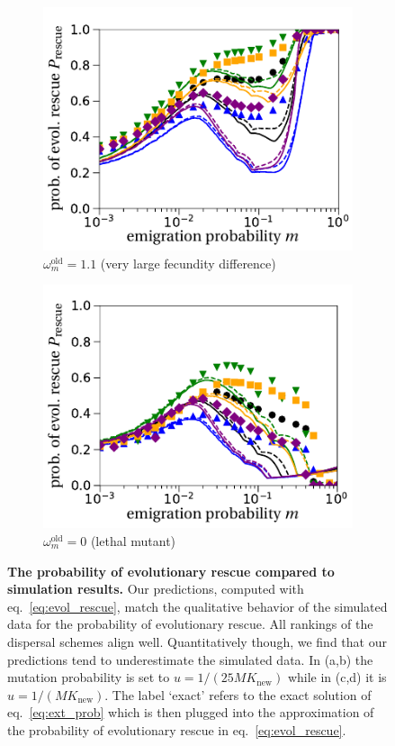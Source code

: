 \documentclass[a4paper,11pt]{article}
\begin{document}
\begin{figure}[t!]
\begin{subfigure}{.5\textwidth}
  		\centering
  		\includegraphics[width=\linewidth]{fig5c.pdf}
  		\caption{$\omega^\text{old}_m=1.1$ (very large fecundity difference)}
	\end{subfigure}%
	\begin{subfigure}{.5\textwidth}
  		\centering
  		\includegraphics[width=\linewidth]{fig5d.pdf}
  		\caption{$\omega^\text{old}_m=0$ (lethal mutant)}
	\end{subfigure}
	\caption{\textbf{The probability of evolutionary rescue compared to simulation results.} \small Our predictions, computed with eq.~\eqref{eq:evol_rescue}, match the qualitative behavior of the simulated data for the probability of evolutionary rescue. All rankings of the dispersal schemes align well. Quantitatively though, we find that our predictions tend to underestimate the simulated data. In (a,b) the mutation probability is set to $u=1/(25MK_{\text{new}})$ while in (c,d) it is $u=1/(MK_{\text{new}})$. The label `exact' refers to the exact solution of eq.~\eqref{eq:ext_prob} which is then plugged into the approximation of the probability of evolutionary rescue in eq.~\eqref{eq:evol_rescue}.}
	\label{fig:rescue}
\end{figure}
\end{document}
